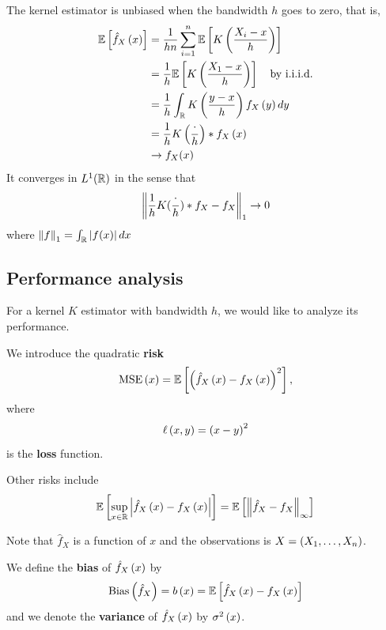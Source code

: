 \begin{remark} The kernel estimator is unbiased when the bandwidth $h$ goes to zero, that is,
  \begin{equation*}
    \begin{split}
      \mathbb{E}\left[\hat{f}_X\left(x\right)\right] & = \frac{1}{hn}\sum_{i=1}^{n}\mathbb{E}\left[K\left(\frac{X_i-x}{h}\right)\right]             \\
                              & = \frac{1}{h}\mathbb{E}\left[K\left(\frac{X_1-x}{h}\right)\right]   \quad \text{by i.i.i.d.} \\
                              & = \frac{1}{h}\int_{\mathbb{R}} K\left(\frac{y-x}{h}\right)f_X\left(y\right)dy                   \\
                              & = \frac{1}{h}K\left(\frac{\cdot}{h}\right)\ast f_X \left(x\right)                     \\
                              & \to f_X(x)
    \end{split}
  \end{equation*}
  It converges in $L^1(\mathbb{R})$ in the sense that $$\left\| \frac{1}{h}K(\frac{\cdot}{h})\ast f_X-f_X \right\|_1\to 0$$ where $\left\| f \right\|_1=\int_{\mathbb{R}}\left| f(x)\right|dx$
\end{remark}
\subsection{Performance analysis}
For a kernel $K$ estimator with bandwidth $h$, we would like to analyze its
performance.
\begin{definition}
  We introduce the quadratic \textbf{risk}
  \begin{equation*}
    \mathrm{MSE}\left(x\right) = \mathbb{E}\left[\left(\hat{f}_X\left(x\right) - f_X\left(x\right)\right)^2\right],
  \end{equation*}
  where
  \begin{equation*}
    \ell\left(x,y\right) = \left(x-y\right)^2
  \end{equation*}
  is the \textbf{loss} function.

  Other risks include
  \begin{equation*}
    \mathbb{E}\left[\sup_{x\in \mathbb{R}} \left| \hat{f}_X\left(x\right)-f_X\left(x\right)\right|\right] = \mathbb{E}\left[\left\| \hat{f}_X-f_X  \right\|_\infty\right]
  \end{equation*}
\end{definition}
Note that $\hat{f}_X$ is a function of $x$ and the observations is $X= \left(X_1,\ldots, X_n\right)$.

\begin{definition}
  We define the \textbf{bias} of $\hat{f}_X\left(x\right)$ by
  \begin{equation*}
    \mathrm{Bias}\left(\hat{f}_X\right) = b\left(x\right) = \mathbb{E}\left[\hat{f}_X\left(x\right) - f_X\left(x\right)\right]
  \end{equation*}
  and we denote the \textbf{variance} of $\hat{f}_X\left(x\right)$ by $\sigma^2\left(x\right)$.
\end{definition}

